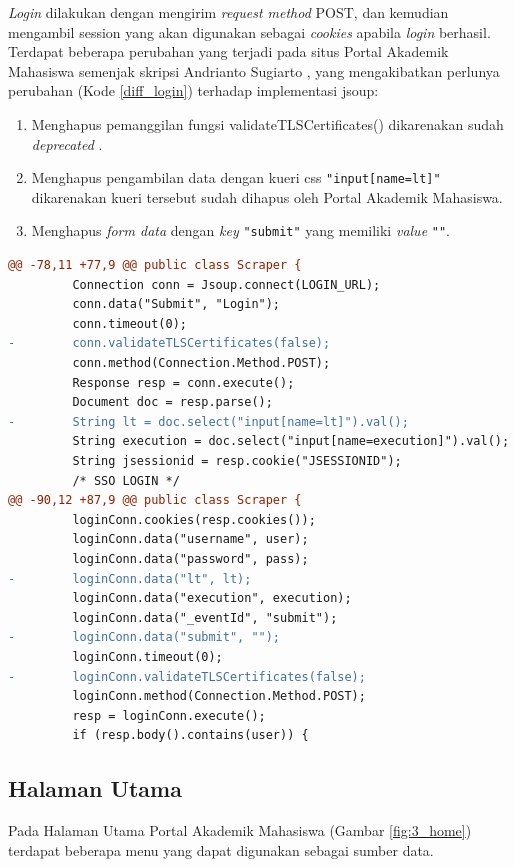 \textit{Login} dilakukan dengan mengirim \textit{request method} POST, dan kemudian mengambil session yang akan digunakan sebagai \textit{cookies} apabila \textit{login} berhasil.
Terdapat beberapa perubahan yang terjadi pada situs Portal Akademik Mahasiswa semenjak skripsi Andrianto Sugiarto \cite{ifstupor}, yang mengakibatkan perlunya perubahan (Kode \ref{diff_login}) terhadap implementasi jsoup:

\begin{enumerate}
    \item Menghapus pemanggilan fungsi validateTLSCertificates() dikarenakan sudah \textit{deprecated} \cite{jsoup}.
    \item Menghapus pengambilan data dengan kueri css \texttt{"input[name=lt]"} dikarenakan kueri tersebut sudah dihapus oleh Portal Akademik Mahasiswa.
    \item Menghapus \textit{form data} dengan \textit{key} \texttt{"submit"} yang memiliki \textit{value} \texttt{""}.
\end{enumerate}

\begin{lstlisting}[language=diff, caption=Perubahan Implementasi Jsoup Login, label=diff_login]
@@ -78,11 +77,9 @@ public class Scraper {
         Connection conn = Jsoup.connect(LOGIN_URL);
         conn.data("Submit", "Login");
         conn.timeout(0);
-        conn.validateTLSCertificates(false);
         conn.method(Connection.Method.POST);
         Response resp = conn.execute();
         Document doc = resp.parse();
-        String lt = doc.select("input[name=lt]").val();
         String execution = doc.select("input[name=execution]").val();
         String jsessionid = resp.cookie("JSESSIONID");
         /* SSO LOGIN */
@@ -90,12 +87,9 @@ public class Scraper {
         loginConn.cookies(resp.cookies());
         loginConn.data("username", user);
         loginConn.data("password", pass);
-        loginConn.data("lt", lt);
         loginConn.data("execution", execution);
         loginConn.data("_eventId", "submit");
-        loginConn.data("submit", "");
         loginConn.timeout(0);
-        loginConn.validateTLSCertificates(false);
         loginConn.method(Connection.Method.POST);
         resp = loginConn.execute();
         if (resp.body().contains(user)) {
\end{lstlisting}

\subsection{Halaman Utama}
Pada Halaman Utama Portal Akademik Mahasiswa (Gambar \ref{fig:3_home}) terdapat beberapa menu yang dapat digunakan sebagai sumber data.

